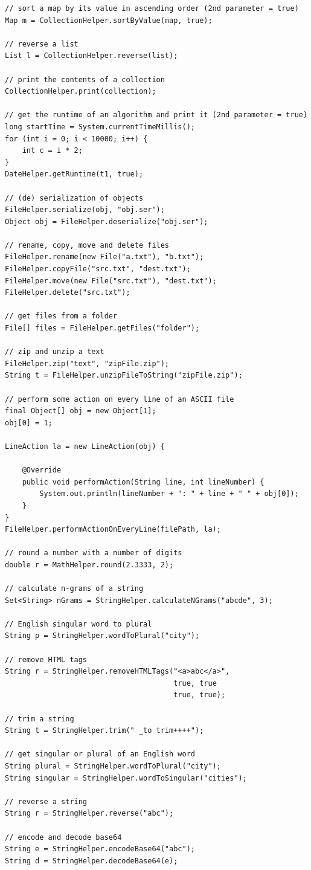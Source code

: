 \documentclass[a4paper,twoside]{book}      %
\begin{document}
\begin{codelisting}
\begin{lstlisting}[frame=tb]
// sort a map by its value in ascending order (2nd parameter = true)
Map m = CollectionHelper.sortByValue(map, true);

// reverse a list
List l = CollectionHelper.reverse(list);

// print the contents of a collection
CollectionHelper.print(collection);

// get the runtime of an algorithm and print it (2nd parameter = true)
long startTime = System.currentTimeMillis();
for (int i = 0; i < 10000; i++) {
	int c = i * 2;
}
DateHelper.getRuntime(t1, true);

// (de) serialization of objects
FileHelper.serialize(obj, "obj.ser");
Object obj = FileHelper.deserialize("obj.ser");

// rename, copy, move and delete files
FileHelper.rename(new File("a.txt"), "b.txt");
FileHelper.copyFile("src.txt", "dest.txt");
FileHelper.move(new File("src.txt"), "dest.txt");
FileHelper.delete("src.txt");

// get files from a folder
File[] files = FileHelper.getFiles("folder");

// zip and unzip a text
FileHelper.zip("text", "zipFile.zip");
String t = FileHelper.unzipFileToString("zipFile.zip");

// perform some action on every line of an ASCII file
final Object[] obj = new Object[1];
obj[0] = 1;

LineAction la = new LineAction(obj) {
  
    @Override
    public void performAction(String line, int lineNumber) {
        System.out.println(lineNumber + ": " + line + " " + obj[0]); 
    }
}
FileHelper.performActionOnEveryLine(filePath, la);

// round a number with a number of digits
double r = MathHelper.round(2.3333, 2);

// calculate n-grams of a string
Set<String> nGrams = StringHelper.calculateNGrams("abcde", 3);

// English singular word to plural
String p = StringHelper.wordToPlural("city");

// remove HTML tags
String r = StringHelper.removeHTMLTags("<a>abc</a>",
                                       true, true
                                       true, true);

// trim a string
String t = StringHelper.trim(" _to trim++++");

// get singular or plural of an English word
String plural = StringHelper.wordToPlural("city");
String singular = StringHelper.wordToSingular("cities");

// reverse a string
String r = StringHelper.reverse("abc");

// encode and decode base64
String e = StringHelper.encodeBase64("abc");
String d = StringHelper.decodeBase64(e);

\end{lstlisting}
\end{codelisting}
\end{document}

